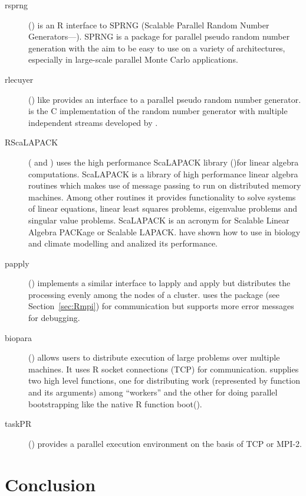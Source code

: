 \begin{description}
\item[rsprng] (\cite{li07rsprng}) is an R interface to SPRNG (Scalable Parallel Random
  Number Generators---\cite{mascagni00ssl}). SPRNG is a package for parallel
  pseudo random number generation with the aim to be easy to use on a
  variety of architectures, especially in large-scale parallel Monte
  Carlo applications.
\item[rlecuyer] (\cite{sevcikova05rlecuyer}) like 
  provides an interface to a parallel pseudo random number
  generator.  is the C implementation of the  
  random number generator with multiple independent streams developed
  by \cite{l'ecuyer02RNG}.
\item[RScaLAPACK] (\cite{samatova05RSca} and \cite{yoginath05rhp})
  uses the high performance ScaLAPACK library
  (\cite{dongarra97sus})for linear algebra computations. ScaLAPACK is
  a library of high performance linear algebra routines which makes
  use of message passing to run on distributed memory machines. Among
  other routines it provides functionality to solve systems of linear equations, linear
  least squares problems, eigenvalue problems and singular value
  problems. ScaLAPACK is an acronym for Scalable Linear Algebra
  PACKage or Scalable LAPACK. \cite{samatova06hps} have shown how to
  use  in biology and climate modelling and analized
  its performance.
\item[papply] (\cite{currie05papply}) implements a similar interface
  to lapply and apply but distributes the processing evenly among the
  nodes of a cluster.  uses the package  (see
  Section~\ref{sec:Rmpi}) for
  communication but supports more error messages for debugging.
\item[biopara] (\cite{lazar06biopara}) allows users to distribute
  execution of large problems over multiple machines. It uses R socket
  connections (TCP) for communication.  supplies two high
  level functions, one for distributing work (represented by function
  and its arguments) among ``workers'' and the other for doing
  parallel bootstrapping like the native R function boot(). 
\item[taskPR] (\cite{samatova04taskPR}) provides a parallel execution environment on
  the basis of TCP or MPI-2.
\end{description}

\section{Conclusion}

